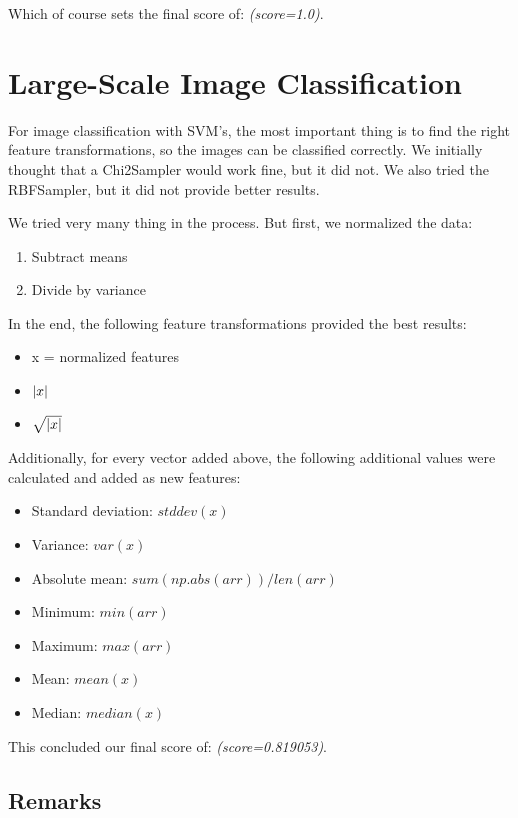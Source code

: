 \documentclass[a4paper, 11pt]{article}
\DeclarePairedDelimiter{\abs}{\lvert}{\rvert}
\begin{document}
Which of course sets the final score of: \emph{(score=1.0)}.

\section{Large-Scale Image Classification}

For image classification with SVM's, the most important thing is to find the right feature transformations, so the images can be classified correctly. We initially thought that a Chi2Sampler \cite{Chi2Sampler} would work fine, but it did not. We also tried the RBFSampler, but it did not provide better results.

We tried very many thing in the process. But first, we normalized the data:

\begin{enumerate}
\item Subtract means
\item Divide by variance
\end{enumerate}

In the end, the following feature transformations provided the best results:

\begin{itemize}
\item x = normalized features
\item $\abs{x}$
\item $\sqrt{\abs{x}}$
\end{itemize}

Additionally, for every vector added above, the following additional values were calculated and added as new features:

\begin{itemize}
\item Standard deviation: $stddev(x)$
\item Variance: $var(x)$
\item Absolute mean: $sum(np.abs(arr)) / len(arr)$
\item Minimum: $min(arr)$
\item Maximum: $max(arr)$
\item Mean: $mean(x)$
\item Median: $median(x)$
\end{itemize}

This concluded our final score of: \emph{(score=0.819053)}.

\subsection{Remarks}
\end{document}
